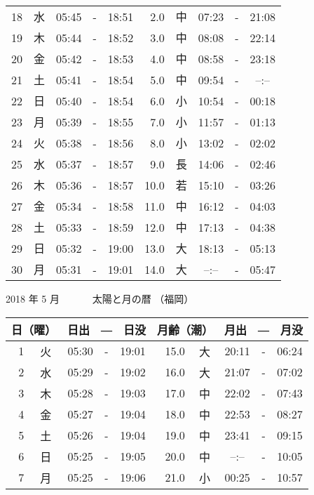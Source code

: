 \documentclass[a4j,10pt]{jsarticle}
\begin{document}
\begin{center}
\begin{table}[ht]
\begin{center}
\begin{tabular}{|rc|ccc|rc|ccc|}
 18 & 水 & 05:45 &-& 18:51 &  2.0 & 中 & 07:23 &-& 21:08 \\
 19 & 木 & 05:44 &-& 18:52 &  3.0 & 中 & 08:08 &-& 22:14 \\
 20 & 金 & 05:42 &-& 18:53 &  4.0 & 中 & 08:58 &-& 23:18 \\
 21 & 土 & 05:41 &-& 18:54 &  5.0 & 中 & 09:54 &-&  --:--  \\
 22 & 日 & 05:40 &-& 18:54 &  6.0 & 小 & 10:54 &-& 00:18 \\
 23 & 月 & 05:39 &-& 18:55 &  7.0 & 小 & 11:57 &-& 01:13 \\
 24 & 火 & 05:38 &-& 18:56 &  8.0 & 小 & 13:02 &-& 02:02 \\
 25 & 水 & 05:37 &-& 18:57 &  9.0 & 長 & 14:06 &-& 02:46 \\
 26 & 木 & 05:36 &-& 18:57 & 10.0 & 若 & 15:10 &-& 03:26 \\
 27 & 金 & 05:34 &-& 18:58 & 11.0 & 中 & 16:12 &-& 04:03 \\
 28 & 土 & 05:33 &-& 18:59 & 12.0 & 中 & 17:13 &-& 04:38 \\
 29 & 日 & 05:32 &-& 19:00 & 13.0 & 大 & 18:13 &-& 05:13 \\
 30 & 月 & 05:31 &-& 19:01 & 14.0 & 大 &  --:--  &-& 05:47 \\
    \hline
    \end{tabular}
    \end{center}
\end{table}
\newpage
  {\large 2018 年  5 月}
  {\Large 　　　太陽と月の暦   （福岡） }
  \begin{table}[ht]
  \begin{center}
     \begin{tabular}{|rc|ccc|rc|ccc|}
     \hline
     \multicolumn{2}{|c|}{日（曜）} & \multicolumn{3}{c|}{日出　―　日没} & \multicolumn{2}{c|}{月齢（潮）} & \multicolumn{3}{c|}{月出　―　月没}\\
     \hline
  1 & 火 & 05:30 &-& 19:01 & 15.0 & 大 & 20:11 &-& 06:24 \\
  2 & 水 & 05:29 &-& 19:02 & 16.0 & 大 & 21:07 &-& 07:02 \\
  3 & 木 & 05:28 &-& 19:03 & 17.0 & 中 & 22:02 &-& 07:43 \\
  4 & 金 & 05:27 &-& 19:04 & 18.0 & 中 & 22:53 &-& 08:27 \\
  5 & 土 & 05:26 &-& 19:04 & 19.0 & 中 & 23:41 &-& 09:15 \\
  6 & 日 & 05:25 &-& 19:05 & 20.0 & 中 &  --:--  &-& 10:05 \\
  7 & 月 & 05:25 &-& 19:06 & 21.0 & 小 & 00:25 &-& 10:57 \\

\end{tabular}
\end{center}
\end{table}
\end{center}
\end{document}
